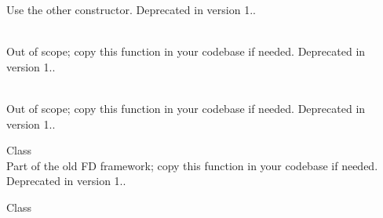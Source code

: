 \begin{DoxyRefList}
\label{deprecated__deprecated000008}%
%
Use the other constructor. Deprecated in version 1..  
\item[Member \doxylink{namespace_quant_lib_abd5a6a180249e9d37d62387fbdcbe288}{Quant\+Lib\+::parallel\+Analysis} (const std\+::vector\texorpdfstring{$<$}{<} \doxylink{class_quant_lib_1_1_handle}{Handle$<$ Simple\+Quote $>$} \texorpdfstring{$>$}{>} \&, const std\+::vector\texorpdfstring{$<$}{<} ext\+::shared\+\_\+ptr$<$ Instrument $>$ \texorpdfstring{$>$}{>} \&, const std\+::vector$<$ Real $>$ \&quantities, \doxylink{namespace_quant_lib_a372ac5c1a422a6b276fe0552d4d83f50}{Real} shift=0.\+0001, \doxylink{namespace_quant_lib_aec640f352a6039438786a95fc53edb98}{Sensitivity\+Analysis} type=Centered, \doxylink{namespace_quant_lib_a372ac5c1a422a6b276fe0552d4d83f50}{Real} reference\+Npv=Null$<$ Real $>$())]\hfill \\
\label{deprecated__deprecated000032}%
%
Out of scope; copy this function in your codebase if needed. Deprecated in version 1..  
\item[Member \doxylink{namespace_quant_lib_a152440af1e25db009656a1725556b207}{Quant\+Lib\+::parallel\+Analysis} (const std\+::vector\texorpdfstring{$<$}{<} std\+::vector\texorpdfstring{$<$}{<} \doxylink{class_quant_lib_1_1_handle}{Handle$<$ Simple\+Quote $>$} \texorpdfstring{$>$}{>} \texorpdfstring{$>$}{>} \&, const std\+::vector\texorpdfstring{$<$}{<} ext\+::shared\+\_\+ptr$<$ Instrument $>$ \texorpdfstring{$>$}{>} \&, const std\+::vector$<$ Real $>$ \&quantities, \doxylink{namespace_quant_lib_a372ac5c1a422a6b276fe0552d4d83f50}{Real} shift=0.\+0001, \doxylink{namespace_quant_lib_aec640f352a6039438786a95fc53edb98}{Sensitivity\+Analysis} type=Centered, \doxylink{namespace_quant_lib_a372ac5c1a422a6b276fe0552d4d83f50}{Real} reference\+Npv=Null$<$ Real $>$())]\hfill \\
\label{deprecated__deprecated000033}%
%
Out of scope; copy this function in your codebase if needed. Deprecated in version 1..  
\item[Class \doxylink{class_quant_lib_1_1_pde_b_s_m}{Quant\+Lib\+::Pde\+BSM} ]\hfill \\
\label{deprecated__deprecated000116}%
%
Part of the old FD framework; copy this function in your codebase if needed. Deprecated in version 1..  
\item[Class \doxylink{class_quant_lib_1_1_pde_constant_coeff}{Quant\+Lib\+::Pde\+Constant\+Coeff\texorpdfstring{$<$}{<} Pde\+Class \texorpdfstring{$>$}{>}} ]\hfill \\

\end{DoxyRefList}
